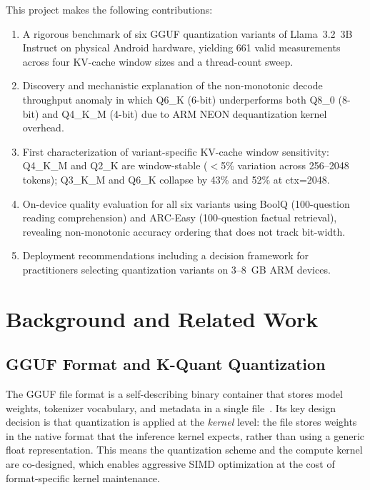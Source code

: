 \documentclass[conference]{IEEEtran}
\begin{document}
This project makes the following contributions:

\begin{enumerate}
  \item A rigorous benchmark of six GGUF quantization variants of Llama~3.2~3B
        Instruct on physical Android hardware, yielding 661 valid measurements
        across four KV-cache window sizes and a thread-count sweep.
  \item Discovery and mechanistic explanation of the non-monotonic decode
        throughput anomaly in which Q6\_K (6-bit) underperforms both Q8\_0
        (8-bit) and Q4\_K\_M (4-bit) due to ARM NEON dequantization kernel
        overhead.
  \item First characterization of variant-specific KV-cache window sensitivity:
        Q4\_K\_M and Q2\_K are window-stable ($<$5\% variation across 256--2048
        tokens); Q3\_K\_M and Q6\_K collapse by 43\% and 52\% at ctx=2048.
  \item On-device quality evaluation for all six variants using BoolQ (100-question
        reading comprehension) and ARC-Easy (100-question factual retrieval),
        revealing non-monotonic accuracy ordering that does not track bit-width.
  \item Deployment recommendations including a decision framework for practitioners
        selecting quantization variants on 3--8~GB ARM devices.
\end{enumerate}

\section{Background and Related Work}

\subsection{GGUF Format and K-Quant Quantization}

The GGUF file format is a self-describing binary container that stores model
weights, tokenizer vocabulary, and metadata in a single file~\cite{gguf}.
Its key design decision is that quantization is applied at the \emph{kernel}
level: the file stores weights in the native format that the inference kernel
expects, rather than using a generic float representation. This means the
quantization scheme and the compute kernel are co-designed, which enables
aggressive SIMD optimization at the cost of format-specific kernel maintenance.
\end{document}
